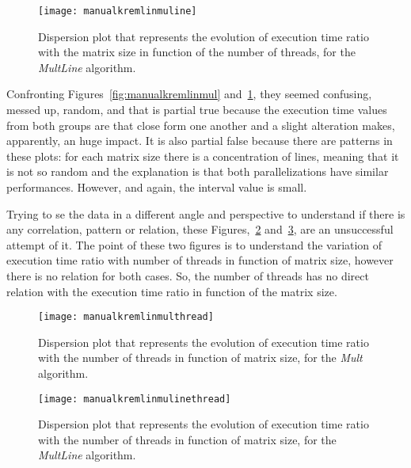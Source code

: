 \begin{figure}[htb]
	\begin{center}
		\leavevmode
		\texttt{[image: manualkremlinmuline]}
		\caption{Dispersion plot that represents the evolution of execution time ratio with the matrix size in function of the number of threads, for the \textit{MultLine} algorithm.}
		\label{fig:manualkremlinmuline}
	\end{center}
\end{figure}

Confronting Figures~\ref{fig:manualkremlinmul} and~\ref{fig:manualkremlinmuline}, they seemed confusing, messed up, random, and that is partial true because the execution time values from both groups are that close form one another and a slight alteration makes, apparently, an huge impact. It is also partial false because there are patterns in these plots: for each matrix size there is a concentration of lines, meaning that it is not so random and the explanation is that both parallelizations have similar performances. However, and again, the interval value is small.

Trying to se the data in a different angle and perspective to understand if there is any correlation, pattern or relation, these Figures,~\ref{fig:manualkremlinmulthread} and~\ref{fig:manualkremlinmulinethread}, are an unsuccessful attempt of it. The point of these two figures is to understand the variation of execution time ratio with number of threads in function of matrix size, however there is no relation for both cases. So, the number of threads has no direct relation with the execution time ratio in function of the matrix size.


\begin{figure}[htb]
	\begin{center}
		\leavevmode
		\texttt{[image: manualkremlinmulthread]}
		\caption{Dispersion plot that represents the evolution of execution time ratio with the number of threads in function of matrix size, for the \textit{Mult} algorithm.}
		\label{fig:manualkremlinmulthread}
	\end{center}
\end{figure}

\begin{figure}[htb]
	\begin{center}
		\leavevmode
		\texttt{[image: manualkremlinmulinethread]}
		\caption{Dispersion plot that represents the evolution of execution time ratio with the number of threads in function of matrix size, for the \textit{MultLine} algorithm.}
		\label{fig:manualkremlinmulinethread}
	\end{center}
\end{figure}

